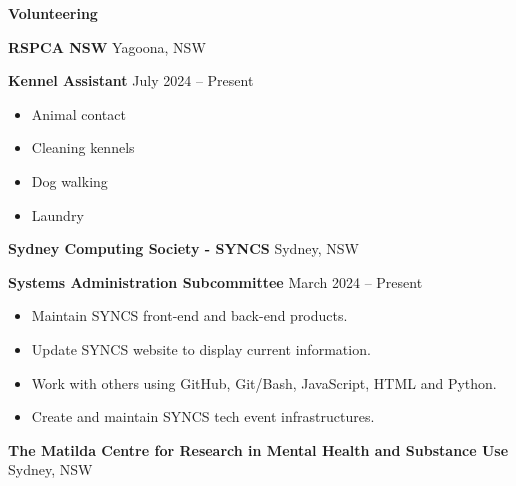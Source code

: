 \documentclass[11pt]{article}
\begin{document}

\begin{center}
    \textbf{Volunteering}\\ 
    \hrulefill
\end{center}

\textbf{RSPCA NSW} \hfill Yagoona, NSW

\textbf{Kennel Assistant} \hfill July 2024 – Present
\begin{itemize}[noitemsep, topsep=0pt, partopsep=0pt, parsep=0pt]
    \item Animal contact
    \item Cleaning kennels
    \item Dog walking
    \item Laundry
\end{itemize}

\vspace{12pt}

\textbf{Sydney Computing Society - SYNCS} \hfill Sydney, NSW

\textbf{Systems Administration Subcommittee} \hfill March 2024 – Present
\begin{itemize}[noitemsep, topsep=0pt, partopsep=0pt, parsep=0pt]
    \item Maintain SYNCS front-end and back-end products.
    \item Update SYNCS website to display current information.
    \item Work with others using GitHub, Git/Bash, JavaScript, HTML and Python.
    \item Create and maintain SYNCS tech event infrastructures.
\end{itemize}

\vspace{12pt}

\textbf{The Matilda Centre for Research in Mental Health and Substance Use} \hfill Sydney, NSW
\end{document}
